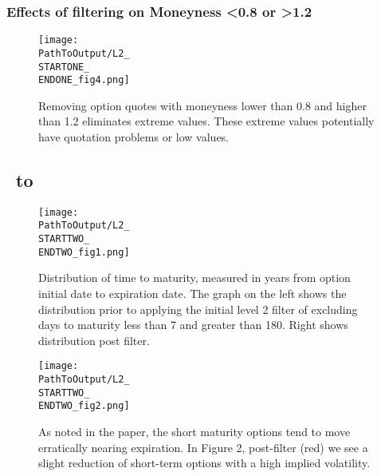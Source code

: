 \begin{appendix}
\subsubsection{Effects of filtering on Moneyness <0.8 or >1.2}
\begin{figure}[H] %
  \centering
{}
  \texttt{[image: \\PathToOutput/L2\_\\STARTONE\_\\ENDONE\_fig4.png]}%
\captionsetup{font=normalfont}
  \caption{Removing option quotes with moneyness lower than 0.8 and higher than 1.2 eliminates extreme values. These extreme values potentially have quotation problems or low values.}
  \label{fig:time1lvl2fig4}
\end{figure}


\subsection{\STARTTWO\ to \ENDTWO }

\begin{figure}[H] %
  \centering
  \texttt{[image: \\PathToOutput/L2\_\\STARTTWO\_\\ENDTWO\_fig1.png]}%
\captionsetup{font=normalfont}
  \caption{Distribution of time to maturity, measured in years from option initial date to expiration date. The graph on the left shows the distribution prior to applying the initial level 2 filter of excluding days to maturity less than 7 and greater than 180. Right shows distribution post filter.}
\label{fig:time2lvl2fig1}
\end{figure}

\begin{figure}[H] %
  \centering
  \texttt{[image: \\PathToOutput/L2\_\\STARTTWO\_\\ENDTWO\_fig2.png]}%
\captionsetup{font=normalfont}
  \caption{As noted in the paper, the short maturity options tend to move erratically nearing expiration. In Figure 2, post-filter (red) we see a slight reduction of short-term options with a high implied volatility.}
\label{fig:time2lvl2fig2}
\end{figure}


\end{appendix}
